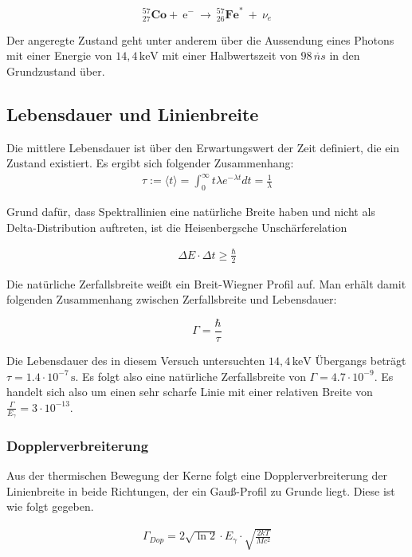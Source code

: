 \[ ^{57}_{27}\mathrm{\textbf{Co}} +\ \mathrm{e}^-\ \longrightarrow\ ^{57}_{26}\mathrm{\textbf{Fe}}^*\ +\ \nu_e\]


Der angeregte Zustand geht unter anderem über die Aussendung eines Photons mit einer Energie von $14,4\,\mathrm{keV}$ mit einer Halbwertszeit von $98\,\mathring{ns}$ in den Grundzustand über.

\subsection{Lebensdauer und Linienbreite}

Die mittlere Lebensdauer ist über den Erwartungswert der Zeit definiert, die ein Zustand existiert. Es ergibt sich folgender Zusammenhang:
\begin{align}
\tau:=\langle t\rangle=\int_{0}^{\infty}t\lambda e^{-\lambda t}dt=\frac{1}{\lambda} 
\end{align}

Grund dafür, dass Spektrallinien eine natürliche Breite haben und nicht als Delta-Distribution auftreten, ist die Heisenbergsche Unschärferelation

\begin{align}
\Delta E\cdot\Delta t\geq\frac{\hbar}{2}
\end{align}


Die natürliche Zerfallsbreite weißt ein Breit-Wiegner Profil auf. Man erhält damit folgenden Zusammenhang zwischen Zerfallsbreite und Lebensdauer:

\[\Gamma=\frac{\hbar}{\tau}\]


Die Lebensdauer des in diesem Versuch untersuchten $14,4\,\mathrm{keV}$ Übergangs beträgt  $\tau = 1.4\cdot 10^{-7}\,\mathrm{s}$. Es folgt also eine natürliche Zerfallsbreite von $\Gamma = 4.7\cdot 10^{-9}$. Es handelt sich also um einen sehr scharfe Linie mit einer relativen Breite von $\frac{\Gamma}{E_{\gamma}}=3\cdot 10^{-13}$.


\subsubsection{Dopplerverbreiterung}

Aus der thermischen Bewegung der Kerne folgt eine Dopplerverbreiterung der Linienbreite in beide Richtungen, der ein Gauß-Profil zu Grunde liegt. Diese ist wie folgt gegeben.

\begin{align}
\Gamma_{Dop} = 2\sqrt{\ln2}\cdot E_{\gamma}\cdot\sqrt{\frac{2kT}{Mc^2}}
\end{align}



